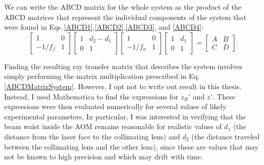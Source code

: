 We can write the ABCD matrix for the whole system as the product of the ABCD matrices that represent the individual components of the system that were found in Eqs.\,\eqref{ABCD1},\eqref{ABCD2},\eqref{ABCD3}, and \eqref{ABCD4}: 
\begin{equation}\label{ABCDMatrixSystem}
\begin{bmatrix}
1 & 0 \\ -1/f_{f} & 1
\end{bmatrix}
\begin{bmatrix}
1 & d_2-d_1 \\ 0 & 1
\end{bmatrix}
\begin{bmatrix}
1 & 0 \\ -1/f_{a} & 1
\end{bmatrix}
\begin{bmatrix}
1 & d_1 \\ 0 & 1
\end{bmatrix}
=
\begin{bmatrix}
A & B \\ C & D
\end{bmatrix}.
\end{equation}

Finding the resulting ray transfer matrix that describes the system involves simply performing the matrix multiplication prescribed in Eq.\,\ref{ABCDMatrixSystem}. However, I opt not to write out result in this thesis. Instead, I used Mathematica to find the expressions for $z_R'$ and $z'$. These expressions were then evaluated numerically for several values of likely experimental parameters. In particular, I was interested in verifying that the beam waist inside the AOM remains reasonable for realistic values of $d_1$ (the distance from the laser face to the collimating lens) and $d_2$ (the distance traveled between the collimating lens and the other lens), since these are values that may not be known to high precision and which may drift with time. %

